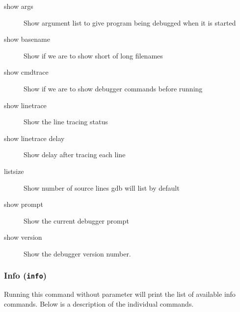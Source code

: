 \begin{description}

\item[show args]

Show argument list to give program being debugged when it is started

\item[show basename]

Show if we are to show short of long filenames

\item[show cmdtrace]

Show if we are to show debugger commands before running

\item[show linetrace]

Show the line tracing status

\item[show linetrace delay]

Show delay after tracing each line

\item[listsize]

Show number of source lines gdb will list by default

\item[show prompt]

Show the current debugger prompt

\item[show version]

Show the debugger version number.

\end{description}

\subsubsection{Info ({\tt info})}

Running this command without parameter will print the list of
available info commands. Below is a description of the individual
commands.

